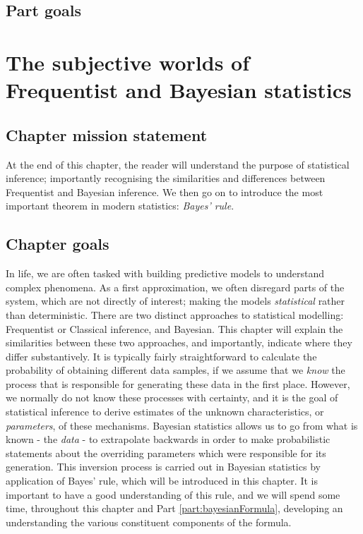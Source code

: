 \documentclass[11pt,fullpage]{book}
\begin{document}
\section{Part goals}

\chapter{The subjective worlds of Frequentist and Bayesian statistics}\label{chap:subjectiveFrequentistBayes}
\section{Chapter mission statement}
At the end of this chapter, the reader will understand the purpose of statistical inference; importantly recognising the similarities and differences between Frequentist and Bayesian inference. We then go on to introduce the most important theorem in modern statistics: \textit{Bayes' rule}.
 
\section{Chapter goals}
In life, we are often tasked with building predictive models to understand complex phenomena. As a first approximation, we often disregard parts of the system, which are not directly of interest; making the models \textit{statistical} rather than deterministic. There are two distinct approaches to statistical modelling: Frequentist or Classical inference, and Bayesian. This chapter will explain the similarities between these two approaches, and importantly, indicate where they differ substantively. It is typically fairly straightforward to calculate the probability of obtaining different data samples, if we assume that we \textit{know} the process that is responsible for generating these data in the first place. However, we normally do not know these processes with certainty, and it is the goal of statistical inference to derive estimates of the unknown characteristics, or \textit{parameters}, of these mechanisms. Bayesian statistics allows us to go from what is known - the \textit{data} - to extrapolate backwards in order to make probabilistic statements about the overriding parameters which were responsible for its generation. This inversion process is carried out in Bayesian statistics by application of Bayes' rule, which will be introduced in this chapter.  It is important to have a good understanding of this rule, and we will spend some time, throughout this chapter and Part \ref{part:bayesianFormula}, developing an understanding the various constituent components of the formula.
\end{document}
